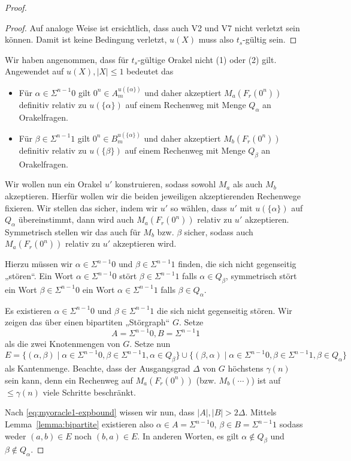 \begin{proof}
\begin{proof}
    Auf analoge Weise ist ersichtlich, dass auch V2 und V7 nicht verletzt sein können.
    Damit ist keine Bedingung verletzt, $u(X)$ muss also $t_s$-gültig sein.
\end{proof}

Wir haben angenommen, dass für $t_{s}$-gültige Orakel nicht (1) oder (2) gilt. Angewendet auf $u(X), |X|\leq 1$ bedeutet das
\begin{itemize}[nosep]
    \item Für $\alpha\in \Sigma^{n-1}0$ gilt $0^n\in A_m^{u(\{\alpha\})}$ und daher akzeptiert $M_a(F_r(0^n))$ definitiv relativ zu $u(\{\alpha\})$ auf einem Rechenweg mit Menge $Q_\alpha$ an Orakelfragen.
    \item Für $\beta\in \Sigma^{n-1}1$ gilt $0^n\in B_m^{u(\{\alpha\})}$ und daher akzeptiert $M_b(F_r(0^n))$ definitiv relativ zu $u(\{\beta\})$ auf einem Rechenweg mit Menge $Q_\beta$ an Orakelfragen.
\end{itemize}
Wir wollen nun ein Orakel $u'$ konstruieren, sodass sowohl $M_a$ als auch $M_b$ akzeptieren.
Hierfür wollen wir die beiden jeweiligen akzeptierenden Rechenwege fixieren.
Wir stellen das sicher, indem wir $u'$ so wählen, dass $u'$ mit $u(\{\alpha\})$ auf $Q_\alpha$ übereinstimmt, dann wird auch $M_a(F_r(0^n))$ relativ zu $u'$ akzeptieren.
Symmetrisch stellen wir das auch für $M_b$ bzw. $\beta$ sicher, sodass auch $M_a(F_r(0^n))$ relativ zu $u'$ akzeptieren wird.

Hierzu müssen wir $\alpha\in\Sigma^{n-1}0$ und $\beta\in\Sigma^{n-1}1$ finden, die sich nicht gegenseitig „stören“.
Ein Wort $\alpha\in\Sigma^{n-1}0$ stört $\beta\in\Sigma^{n-1}1$ falls $\alpha\in Q_\beta$, 
symmetrisch stört ein Wort $\beta\in\Sigma^{n-1}0$ ein Wort  $\alpha\in\Sigma^{n-1}1$ falls $\beta\in Q_\alpha$.

Es existieren $\alpha\in\Sigma^{n-1}0$ und $\beta\in\Sigma^{n-1}1$ die sich nicht gegenseitig stören. Wir zeigen das über einen bipartiten „Störgraph“ $G$.
Setze 
\[ A=\Sigma^{n-1}0, B=\Sigma^{n-1}1 \]
als die zwei Knotenmengen von $G$.
Setze nun
\[ E = \{ (\alpha, \beta) \mid \alpha\in\Sigma^{n-1}0, \beta\in\Sigma^{n-1}1, \alpha\in Q_\beta\} \cup \{ (\beta, \alpha) \mid \alpha\in\Sigma^{n-1}0, \beta\in\Sigma^{n-1}1, \beta\in Q_\alpha\} \]
als Kantenmenge.
Beachte, dass der Ausgangsgrad $\Delta$ von $G$ höchstens $\gamma(n)$ sein kann, denn ein Rechenweg auf $M_a(F_r(0^n))$ (bzw. $M_b(\cdots)$) ist auf $\leq \gamma(n)$ viele Schritte beschränkt.

Nach \eqref{eq:myoracle1-expbound} wissen wir nun, dass $|A|, |B|>2\Delta$. Mittels Lemma~\ref{lemma:bipartite} existieren also $\alpha\in A = \Sigma^{n-1}0$, $\beta\in B=\Sigma^{n-1}1$ sodass weder $(a,b)\in E$ noch $(b,a)\in E$.
In anderen Worten, es gilt $\alpha\not\in Q_\beta$ und $\beta\not\in Q_\alpha$.


\end{proof}
